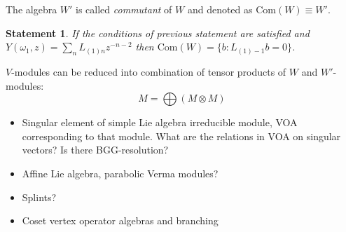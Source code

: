 \documentclass[12pt]{article}
\newtheorem{statement}{Statement}
\begin{document}
The algebra  $W'$ is called {\it commutant} of $W$ and denoted as $\mathrm{Com}(W)\equiv W'$.
\begin{statement}
  If the conditions of previous statement are satisfied and  $Y(\omega_1,z)=\sum_n
  L_{(1)n} z^{-n-2}$ then $\mathrm{Com}(W)=\{b: L_{(1)-1}b=0\}$. 
\end{statement}

$V$-modules can be reduced into combination of tensor products of $W$ and $W'$-modules:
\begin{equation}
  \label{eq:1}
  M=\bigoplus (M\otimes M)
\end{equation}

\begin{itemize}
\item Singular element of simple Lie algebra irreducible module, VOA corresponding to that module.
  What are the relations in VOA on singular vectors? Is there BGG-resolution?
\item Affine Lie algebra, parabolic Verma modules?
\item Splints?
\item Coset vertex operator algebras and branching
\end{itemize}


{}

\end{document}
